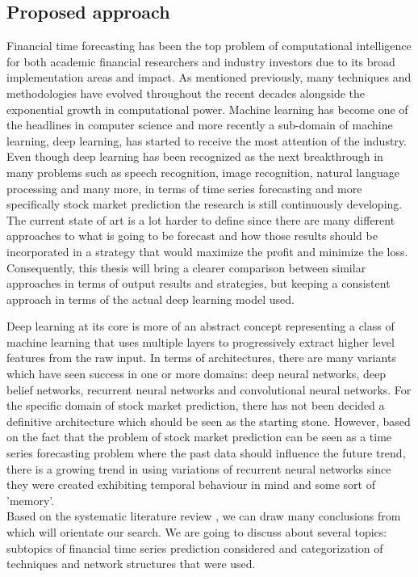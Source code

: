 \subsection{Proposed approach}
Financial time forecasting has been the top problem of computational intelligence for both academic financial researchers and industry investors due to its broad implementation areas and impact. As mentioned previously, many techniques and methodologies have evolved throughout the recent decades alongside the exponential growth in computational power. Machine learning has become one of the headlines in computer science and more recently a sub-domain of machine learning, deep learning, has started to receive the most attention of the industry. Even though deep learning has been recognized as the next breakthrough in many problems such as speech recognition, image recognition, natural language processing and many more, in terms of time series forecasting and more specifically stock market prediction the research is still continuously developing. The current state of art is a lot harder to define since there are many different approaches to what is going to be forecast and how those results should be incorporated in a strategy that would maximize the profit and minimize the loss. Consequently, this thesis will bring a clearer comparison between similar approaches in terms of output results and strategies, but keeping a consistent approach in terms of the actual deep learning model used.

Deep learning at its core is more of an abstract concept representing a class of machine learning that uses multiple layers to progressively extract higher level features from the raw input. In terms of architectures, there are many variants which have seen success in one or more domains: deep neural networks, deep belief networks, recurrent neural networks and convolutional neural networks. For the specific domain of stock market prediction, there has not been decided a definitive architecture which should be seen as the starting stone. However, based on the fact that the problem of stock market prediction can be seen as a time series forecasting problem where the past data should influence the future trend, there is a growing trend in using variations of recurrent neural networks since they were created exhibiting temporal behaviour in mind and some sort of 'memory'. \\

Based on the systematic literature review \cite{sezer2020financial}, we can draw many conclusions from which will orientate our search. We are going to discuss about several topics: subtopics of financial time series prediction considered and categorization of techniques and network structures that were used.

